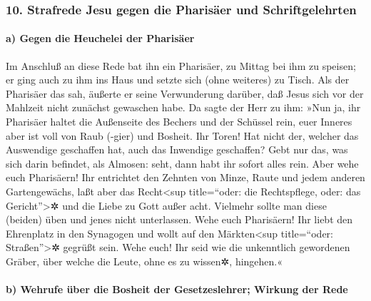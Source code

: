 \hypertarget{strafrede-jesu-gegen-die-pharisuxe4er-und-schriftgelehrten}{%
\subsubsection{10. Strafrede Jesu gegen die Pharisäer und
Schriftgelehrten}\label{strafrede-jesu-gegen-die-pharisuxe4er-und-schriftgelehrten}}

\hypertarget{a-gegen-die-heuchelei-der-pharisuxe4er}{%
\paragraph{a) Gegen die Heuchelei der
Pharisäer}\label{a-gegen-die-heuchelei-der-pharisuxe4er}}

 Im Anschluß an diese Rede bat ihn ein Pharisäer, zu
Mittag bei ihm zu speisen; er ging auch zu ihm ins Haus und setzte sich
(ohne weiteres) zu Tisch.  Als der Pharisäer das sah,
äußerte er seine Verwunderung darüber, daß Jesus sich vor der Mahlzeit
nicht zunächst gewaschen habe.  Da sagte der Herr zu ihm:
»Nun ja, ihr Pharisäer haltet die Außenseite des Bechers und der
Schüssel rein, euer Inneres aber ist voll von Raub (-gier) und Bosheit.
 Ihr Toren! Hat nicht der, welcher das Auswendige
geschaffen hat, auch das Inwendige geschaffen?  Gebt nur
das, was sich darin befindet, als Almosen: seht, dann habt ihr sofort
alles rein.  Aber wehe euch Pharisäern! Ihr entrichtet
den Zehnten von Minze, Raute und jedem anderen Gartengewächs, laßt aber
das Recht\textless sup title=``oder: die Rechtspflege, oder: das
Gericht''\textgreater✲ und die Liebe zu Gott außer acht. Vielmehr sollte
man diese (beiden) üben und jenes nicht unterlassen. 
Wehe euch Pharisäern! Ihr liebt den Ehrenplatz in den Synagogen und
wollt auf den Märkten\textless sup title=``oder: Straßen''\textgreater✲
gegrüßt sein.  Wehe euch! Ihr seid wie die unkenntlich
gewordenen Gräber, über welche die Leute, ohne es zu wissen✲, hingehen.«

\hypertarget{b-wehrufe-uxfcber-die-bosheit-der-gesetzeslehrer-wirkung-der-rede}{%
\paragraph{b) Wehrufe über die Bosheit der Gesetzeslehrer; Wirkung der
Rede}\label{b-wehrufe-uxfcber-die-bosheit-der-gesetzeslehrer-wirkung-der-rede}}

